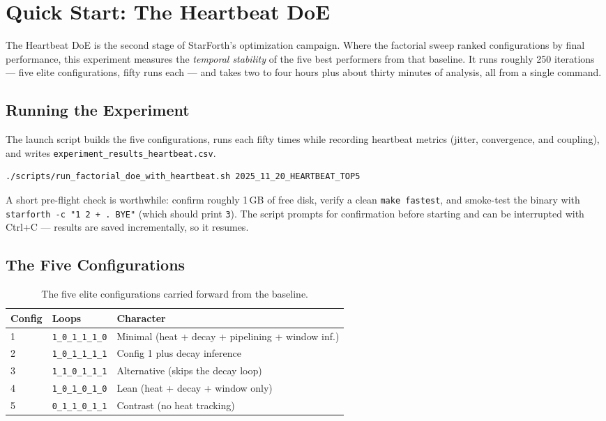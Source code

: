 
\section{Quick Start: The Heartbeat DoE}

The Heartbeat DoE is the second stage of StarForth's optimization campaign.
Where the factorial sweep ranked configurations by final performance, this
experiment measures the \emph{temporal stability} of the five best performers
from that baseline. It runs roughly 250 iterations --- five elite
configurations, fifty runs each --- and takes two to four hours plus about
thirty minutes of analysis, all from a single command.

\subsection{Running the Experiment}

The launch script builds the five configurations, runs each fifty times while
recording heartbeat metrics (jitter, convergence, and coupling), and writes
\texttt{experiment\_results\_heartbeat.csv}.

\begin{lstlisting}[language=bash]
./scripts/run_factorial_doe_with_heartbeat.sh 2025_11_20_HEARTBEAT_TOP5
\end{lstlisting}

A short pre-flight check is worthwhile: confirm roughly 1\,GB of free disk,
verify a clean \texttt{make fastest}, and smoke-test the binary with
\texttt{starforth -c "1 2 + . BYE"} (which should print \texttt{3}). The script
prompts for confirmation before starting and can be interrupted with Ctrl+C ---
results are saved incrementally, so it resumes.

\subsection{The Five Configurations}

\begin{table}[h]
\centering
\begin{tabular}{lll}
\toprule
Config & Loops & Character \\
\midrule
1 & \texttt{1\_0\_1\_1\_1\_0} & Minimal (heat + decay + pipelining + window inf.) \\
2 & \texttt{1\_0\_1\_1\_1\_1} & Config 1 plus decay inference \\
3 & \texttt{1\_1\_0\_1\_1\_1} & Alternative (skips the decay loop) \\
4 & \texttt{1\_0\_1\_0\_1\_0} & Lean (heat + decay + window only) \\
5 & \texttt{0\_1\_1\_0\_1\_1} & Contrast (no heat tracking) \\
\bottomrule
\end{tabular}
\caption{The five elite configurations carried forward from the baseline.}
\end{table}

